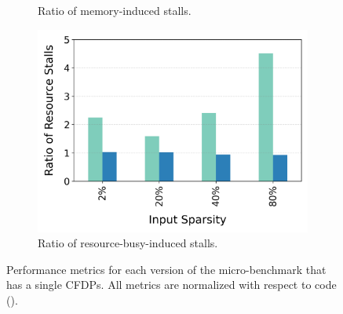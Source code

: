 \begin{figure}[t]
\begin{subfigure}{.33\textwidth}
    \caption{Ratio of memory-induced stalls.}
    \label{fig:single-if-many-scatter-mem-stalls}
  \end{subfigure}
    \begin{subfigure}{.33\textwidth}
        \centering
    \includegraphics[width=\textwidth]{Figures/Evaluations/single_if_many_scatter_resource_stalls.png}
    \caption{Ratio of resource-busy-induced stalls.}
    \label{fig:single-if-many-scatter-resource-stalls}
  \end{subfigure}
  
  \caption{Performance metrics for each version of the \ifThenBench micro-benchmark that has a single CFDPs. All metrics are normalized with respect to \ifconverted code (\ifconv).}
  \label{fig:single-if-many-scatter}
\end{figure}

